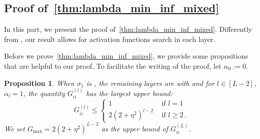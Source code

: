 \documentclass[nohyperref]{article}
\theoremstyle{plain}
\newtheorem{proposition}{Proposition}
\theoremstyle{definition}
\theoremstyle{remark}
\begin{document}
\subsection{Proof of~\cref{thm:lambda_min_inf_mixed}}
\label{ssec:result_mixed_activation_function_inf}

In this part, we present the proof of~\cref{thm:lambda_min_inf_mixed}. Differently from \citet{oymak2020toward}, our result allows for activation functions search in each layer.

Before we prove~\cref{thm:lambda_min_inf_mixed}, we provide some propositions that are helpful to our proof. To facilitate the writing of the proof, let $\alpha_0 := 0$.


\begin{proposition}
\label{prop:maxGii} When $\sigma_1$ is , the remaining layers are with  and for $l \in [L-2]$, $\alpha_{l} = 1$, the quantity $G_{ii}^{(l)}$ has the largest upper bound:
\begin{equation}
    G_{ii}^{(l)} \leq \begin{cases}
1  & \text{ if } l=1 \\
2(2+\eta^2)^{l-2}  & \text{ if } l \geq 2\,.
\end{cases}
\label{eq:Gii_upper_bound}
\end{equation}
We set $G_{\max} = 2(2+\eta^2)^{L-2}$ as the upper bound of $G_{ii}^{(L)}$.
\end{proposition}
\end{document}
